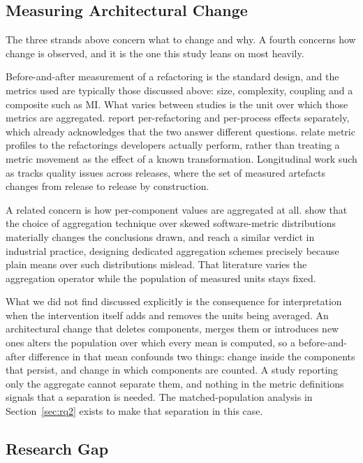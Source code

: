 \documentclass[pdflatex,sn-basic]{sn-jnl}
\begin{document}
\subsection{Measuring Architectural Change}

The three strands above concern what to change and why. A fourth concerns how change is observed, and it is the one this study leans on most heavily.

Before-and-after measurement of a refactoring is the standard design, and the metrics used are typically those discussed above: size, complexity, coupling and a composite such as MI\@. What varies between studies is the unit over which those metrics are aggregated. \citet{szoke2017} report per-refactoring and per-process effects separately, which already acknowledges that the two answer different questions. \citet{bavota2015} relate metric profiles to the refactorings developers actually perform, rather than treating a metric movement as the effect of a known transformation. Longitudinal work such as \citet{berciu2026} tracks quality issues across releases, where the set of measured artefacts changes from release to release by construction.

A related concern is how per-component values are aggregated at all. \citet{vasilescu2011} show that the choice of aggregation technique over skewed software-metric distributions materially changes the conclusions drawn, and \citet{mordal2013} reach a similar verdict in industrial practice, designing dedicated aggregation schemes precisely because plain means over such distributions mislead. That literature varies the aggregation operator while the population of measured units stays fixed.

What we did not find discussed explicitly is the consequence for interpretation when the intervention itself adds and removes the units being averaged. An architectural change that deletes components, merges them or introduces new ones alters the population over which every mean is computed, so a before-and-after difference in that mean confounds two things: change inside the components that persist, and change in which components are counted. A study reporting only the aggregate cannot separate them, and nothing in the metric definitions signals that a separation is needed. The matched-population analysis in Section~\ref{sec:rq2} exists to make that separation in this case.

\subsection{Research Gap}\label{sec:gap}
\end{document}
